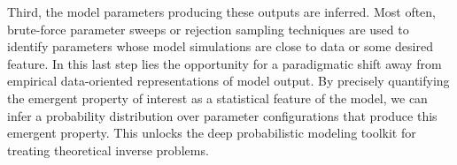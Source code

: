 \documentclass[11pt]{article}
\begin{document}
Third, the model parameters producing these outputs are inferred.
Most often, brute-force parameter sweeps or rejection sampling techniques \cite{liepe2014framework} are used to identify parameters whose model simulations are close to data or some desired feature.
In this last step lies the opportunity for a paradigmatic shift away from empirical data-oriented representations of model output.
By precisely quantifying the emergent property of interest as a statistical feature of the model, we can infer a probability distribution over parameter configurations that produce this emergent property.
This unlocks the deep probabilistic modeling toolkit for treating theoretical inverse problems.
\end{document}
